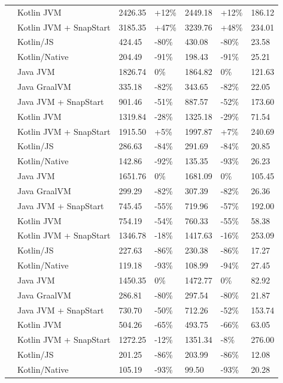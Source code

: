 \begin{table}[htbp]
\begin{tabular}{|>{\centering\arraybackslash}m{1.5cm}|l|p{1.5cm}|p{1.5cm}|p{1.5cm}|p{1.5cm}|p{1.5cm}|}
 & Kotlin JVM & 2426.35 & \mbox{+12\%} & 2449.18 & \mbox{+12\%} & 186.12 \\
 & Kotlin JVM + SnapStart & 3185.35 & \mbox{+47\%} & 3239.76 & \mbox{+48\%} & 234.01 \\
 & Kotlin/JS & 424.45 & \mbox{-80\%} & 430.08 & \mbox{-80\%} & 23.58 \\
 & Kotlin/Native & 204.49 & \mbox{-91\%} & 198.43 & \mbox{-91\%} & 25.21 \\
\midrule
\multirow{7}{*}{512} & Java JVM & 1826.74 & \mbox{0\%} & 1864.82 & \mbox{0\%} & 121.63 \\
 & Java GraalVM & 335.18 & \mbox{-82\%} & 343.65 & \mbox{-82\%} & 22.05 \\
 & Java JVM + SnapStart & 901.46 & \mbox{-51\%} & 887.57 & \mbox{-52\%} & 173.60 \\
 & Kotlin JVM & 1319.84 & \mbox{-28\%} & 1325.18 & \mbox{-29\%} & 71.54 \\
 & Kotlin JVM + SnapStart & 1915.50 & \mbox{+5\%} & 1997.87 & \mbox{+7\%} & 240.69 \\
 & Kotlin/JS & 286.63 & \mbox{-84\%} & 291.69 & \mbox{-84\%} & 20.85 \\
 & Kotlin/Native & 142.86 & \mbox{-92\%} & 135.35 & \mbox{-93\%} & 26.23 \\
\midrule
\multirow{7}{*}{1024} & Java JVM & 1651.76 & \mbox{0\%} & 1681.09 & \mbox{0\%} & 105.45 \\
 & Java GraalVM & 299.29 & \mbox{-82\%} & 307.39 & \mbox{-82\%} & 26.36 \\
 & Java JVM + SnapStart & 745.45 & \mbox{-55\%} & 719.96 & \mbox{-57\%} & 192.00 \\
 & Kotlin JVM & 754.19 & \mbox{-54\%} & 760.33 & \mbox{-55\%} & 58.38 \\
 & Kotlin JVM + SnapStart & 1346.78 & \mbox{-18\%} & 1417.63 & \mbox{-16\%} & 253.09 \\
 & Kotlin/JS & 227.63 & \mbox{-86\%} & 230.38 & \mbox{-86\%} & 17.27 \\
 & Kotlin/Native & 119.18 & \mbox{-93\%} & 108.99 & \mbox{-94\%} & 27.45 \\
\midrule
\multirow{7}{*}{2048} & Java JVM & 1450.35 & \mbox{0\%} & 1472.77 & \mbox{0\%} & 82.92 \\
 & Java GraalVM & 286.81 & \mbox{-80\%} & 297.54 & \mbox{-80\%} & 21.87 \\
 & Java JVM + SnapStart & 730.70 & \mbox{-50\%} & 712.26 & \mbox{-52\%} & 153.74 \\
 & Kotlin JVM & 504.26 & \mbox{-65\%} & 493.75 & \mbox{-66\%} & 63.05 \\
 & Kotlin JVM + SnapStart & 1272.25 & \mbox{-12\%} & 1351.34 & \mbox{-8\%} & 276.00 \\
 & Kotlin/JS & 201.25 & \mbox{-86\%} & 203.99 & \mbox{-86\%} & 12.08 \\
 & Kotlin/Native & 105.19 & \mbox{-93\%} & 99.50 & \mbox{-93\%} & 20.28 \\
\bottomrule
\end{tabular}
\label{table:cold_start_comparison}
\end{table}

